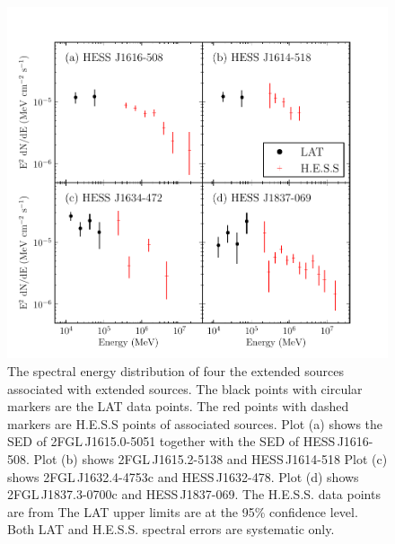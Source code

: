 \documentclass[12pt,preprint]{aastex}
\newcommand{\gev}{\text{GeV}\xspace}
\newcommand{\tev}{\text{TeV}\xspace}
\begin{document}
\clearpage
\begin{figure}
  \begin{center}
    \includegraphics{summary_plots/hess_seds.pdf}
    \end{center}
    \caption{
    The spectral energy distribution of four the extended sources
    associated with extended \tev sources.  The black points with circular
    markers are the LAT data points. The red points with dashed markers
    are H.E.S.S points of associated sources.  Plot (a) shows the \gev
    SED of 2FGL\,J1615.0-5051 together with the \tev SED of HESS\,J1616-508.
    Plot (b) shows 2FGL\,J1615.2-5138 and HESS\,J1614-518 Plot (c)
    shows 2FGL\,J1632.4-4753c and HESS\,J1632-478. Plot (d) shows
    2FGL\,J1837.3-0700c and HESS\,J1837-069. The H.E.S.S. data points
    are from \citep{hess_plane_survey} The LAT upper limits are at the
    95\% confidence level.  Both LAT and H.E.S.S. spectral errors are
    systematic only.}
    \label{hess_seds}
  \end{figure}
\end{document}
